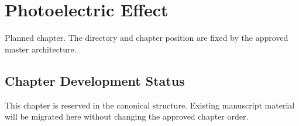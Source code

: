 \chapter{Photoelectric Effect}
\label{chap:15-photoelectric-effect}

\begin{roadmapbox}
Planned chapter. The directory and chapter position are fixed by the approved master architecture.
\end{roadmapbox}

\section*{Chapter Development Status}
This chapter is reserved in the canonical structure. Existing manuscript material will be migrated here without changing the approved chapter order.
